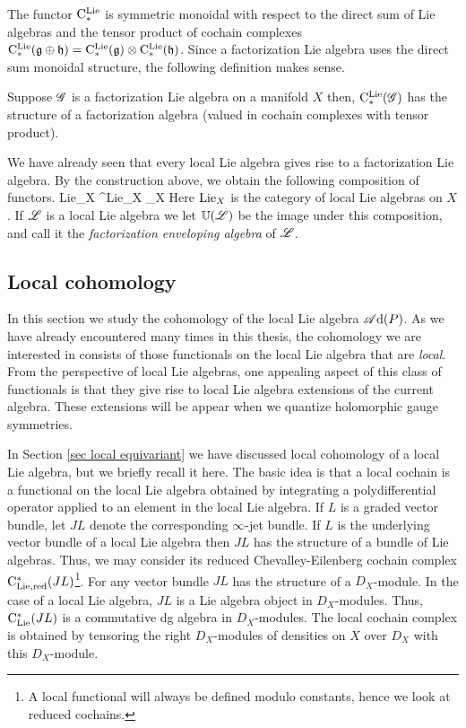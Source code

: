 \documentclass[10pt]{amsart}
\def\sAd{\sA{\rm d}}
\begin{document}
The functor ${\rm C}^{\rm Lie}_*$ is symmetric monoidal with respect to the direct sum of Lie algebras and the tensor product of cochain complexes ${\rm C}^{\rm Lie}_*(\mathfrak g \oplus \mathfrak h) = {\rm C}^{\rm Lie}_*(\mathfrak g) \otimes {\rm C}^{\rm Lie}_*(\mathfrak h)$. 
Since a factorization Lie algebra uses the direct sum monoidal structure, the following definition makes sense.

\begin{dfn/lem}
Suppose $\mathscr G$ is a factorization Lie algebra on a manifold $X$ then, ${\rm C}^{\rm Lie}_*(\mathscr G)$ has the structure of a factorization algebra (valued in cochain complexes with tensor product). 
\end{dfn/lem}

We have already seen that every local Lie algebra gives rise to a factorization Lie algebra.
By the construction above, we obtain the following composition of functors.
\ben
{\rm Lie}_X ^{\rm Lie}_X _X
\een
Here ${\rm Lie}_X$ is the category of local Lie algebras on $X$.
If $\mathscr L$ is a local Lie algebra we let $\mathbb U(\mathscr L)$ be the image under this composition, and call it the {\em factorization enveloping algebra} of $\mathscr L$. 

\subsection{Local cohomology}

In this section we study the cohomology of the local Lie algebra $\sAd(P)$.
As we have already encountered many times in this thesis, the cohomology we are interested in consists of those functionals on the local Lie algebra that are {\em local}.
From the perspective of local Lie algebras, one appealing aspect of this class of functionals is that they give rise to local Lie algebra extensions of the current algebra.
These extensions will be appear when we quantize holomorphic gauge symmetries.

In Section \ref{sec local equivariant} we have discussed local cohomology of a local Lie algebra, but we briefly recall it here.
The basic idea is that a local cochain is a functional on the local Lie algebra obtained by integrating a polydifferential operator applied to an element in the local Lie algebra.
If $L$ is a graded vector bundle, let $JL$ denote the corresponding $\infty$-jet bundle. 
If $L$ is the underlying vector bundle of a local Lie algebra then $JL$ has the structure of a bundle of Lie algebras.
Thus, we may consider its reduced Chevalley-Eilenberg cochain complex ${\rm C}_{\rm Lie, red}^*(JL)$\footnote{A local functional will always be defined modulo constants, hence we look at reduced cochains.}.
For any vector bundle $JL$ has the structure of a $D_X$-module.
In the case of a local Lie algebra, $JL$ is a Lie algebra object in $D_X$-modules.
Thus, ${\rm C}_{{\rm Lie}}^*(JL)$ is a commutative dg algebra in $D_X$-modules. 
The local cochain complex is obtained by tensoring the right $D_X$-modules of densities on $X$ over $D_X$ with this $D_X$-module.
\end{document}
